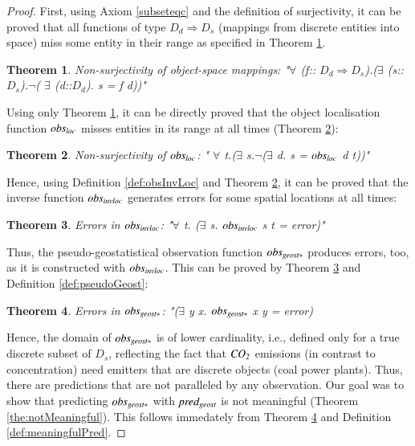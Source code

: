 \documentclass[final,authoryear,1p,times]{elsarticle}
\newtheorem{theorem}{Theorem}
\begin{document}
\begin{proof}
First, using Axiom \ref{subseteqc} and the definition of surjectivity, it can be proved that all functions of type $D_d \Rightarrow D_s$ (mappings from discrete entities into space) miss some entity in their range as specified in Theorem \ref{the:nonSurjectivity}. 
\begin{theorem}
\label{the:nonSurjectivity}
Non-surjectivity of object-space mappings:  "$\forall$ (f:: $D_d \Rightarrow D_s$).($\exists$ (s::$D_s$).$ \neg $( $ \exists $ (d::$D_d$). s = f d))"
\end{theorem}

Using only Theorem \ref{the:nonSurjectivity}, it can be directly proved that the object localisation function ${\it obs_{loc}}$ misses entities in its range at all times (Theorem \ref{the:nsObsLoc}):
\begin{theorem}
\label{the:nsObsLoc}
Non-surjectivity of ${\it obs_{loc}}$: " $\forall$ t.($\exists$ s.$\neg$($\exists$ d. s = ${\it obs_{loc}}$ d t))"
\end{theorem}

Hence, using Definition \ref{def:obsInvLoc} and Theorem \ref{the:nsObsLoc}, it can be proved that the inverse function ${\it obs_{invloc}}$ generates errors for some spatial locations at all times:
\begin{theorem}
\label{the:nsInvObsLoc}
Errors in ${\it obs_{invloc}}$: "$\forall$ t. ($\exists$ s. ${\it obs_{invloc}}$ s t = error)"
\end{theorem}

Thus, the pseudo-geostatistical observation function ${\it obs_{geost*}}$ produces errors, too, as it is constructed with ${\it obs_{invloc}}$. This can be proved by Theorem \ref{the:nsInvObsLoc} and Definition \ref{def:pseudoGeost}:
\begin{theorem}
\label{the:errorsPseudoGeost}
Errors in ${\it obs_{geost*}}$:  "($\exists$ y x. ${\it obs_{geost*}}$ x y = error)
\end{theorem}

Hence, the domain of ${\it obs_{geost*}}$ is of lower cardinality, i.e., defined only for a true discrete subset of $D_s$, reflecting the fact that ${\it CO_2}$ emissions (in contrast to concentration) need emitters that are discrete objects (coal power plants). Thus, there are predictions that are not paralleled by any observation. Our goal was to show that predicting ${\it obs_{geost*}}$ with ${\it pred_{geost}}$ is not meaningful (Theorem \ref{the:notMeaningful}). This follows immedately from Theorem \ref{the:errorsPseudoGeost} and Definition \ref{def:meaningfulPred}.
\end{proof}
\end{document}

